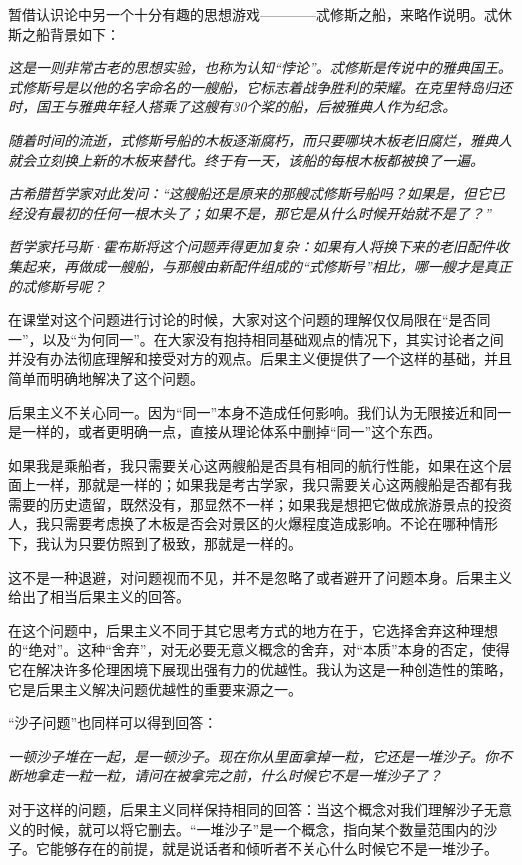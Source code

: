 \documentclass[10pt]{article}
\begin{document}
    暂借认识论中另一个十分有趣的思想游戏————忒修斯之船，来略作说明。忒休斯之船背景如下：
    
    \emph{
    这是一则非常古老的思想实验，也称为认知“悖论”。忒修斯是传说中的雅典国王。式修斯号是以他的名字命名的一艘船，它标志着战争胜利的荣耀。在克里特岛归还时，国王与雅典年轻人搭乘了这艘有30个桨的船，后被雅典人作为纪念。
     }
     \par
     \emph{
  随着时间的流逝，式修斯号船的木板逐渐腐朽，而只要哪块木板老旧腐烂，雅典人就会立刻换上新的木板来替代。终于有一天，该船的每根木板都被换了一遍。
}
\par
\emph{
  古希腊哲学家对此发问：“这艘船还是原来的那艘忒修斯号船吗？如果是，但它已经没有最初的任何一根木头了；如果不是，那它是从什么时候开始就不是了？”
}
\par
\emph{
   哲学家托马斯·霍布斯将这个问题弄得更加复杂：如果有人将换下来的老旧配件收集起来，再做成一艘船，与那艘由新配件组成的“式修斯号”相比，哪一艘才是真正的忒修斯号呢？
}
\par
    
    在课堂对这个问题进行讨论的时候，大家对这个问题的理解仅仅局限在“是否同一”，以及“为何同一”。在大家没有抱持相同基础观点的情况下，其实讨论者之间并没有办法彻底理解和接受对方的观点。后果主义便提供了一个这样的基础，并且简单而明确地解决了这个问题。
      
    后果主义不关心同一。因为“同一”本身不造成任何影响。我们认为无限接近和同一是一样的，或者更明确一点，直接从理论体系中删掉“同一”这个东西。\par
    如果我是乘船者，我只需要关心这两艘船是否具有相同的航行性能，如果在这个层面上一样，那就是一样的；如果我是考古学家，我只需要关心这两艘船是否都有我需要的历史遗留，既然没有，那显然不一样；如果我是想把它做成旅游景点的投资人，我只需要考虑换了木板是否会对景区的火爆程度造成影响。不论在哪种情形下，我认为只要仿照到了极致，那就是一样的。\par
    这不是一种退避，对问题视而不见，并不是忽略了或者避开了问题本身。后果主义给出了相当后果主义的回答。

    在这个问题中，后果主义不同于其它思考方式的地方在于，它选择舍弃这种理想的“绝对”。这种“舍弃”，对无必要无意义概念的舍弃，对“本质”本身的否定，使得它在解决许多伦理困境下展现出强有力的优越性。我认为这是一种创造性的策略，它是后果主义解决问题优越性的重要来源之一。

    “沙子问题”也同样可以得到回答：\par
  \emph{
  一顿沙子堆在一起，是一顿沙子。现在你从里面拿掉一粒，它还是一堆沙子。你不断地拿走一粒一粒，请问在被拿完之前，什么时候它不是一堆沙子了？  
  }   
  \par
    对于这样的问题，后果主义同样保持相同的回答：当这个概念对我们理解沙子无意义的时候，就可以将它删去。“一堆沙子”是一个概念，指向某个数量范围内的沙子。它能够存在的前提，就是说话者和倾听者不关心什么时候它不是一堆沙子。
       
\end{document}
